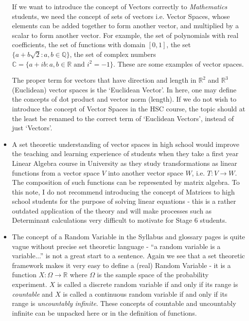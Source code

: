 \documentclass[11pt, a4paper, oneside]{article}
\begin{document}
\begin{itemize}
    If we want to introduce the concept of Vectors correctly to \emph{Mathematics} students, we need the concept of sets of vectors i.e. Vector Spaces, whose elements can be added together to form another vector, and multiplied by a scalar to form another vector. For example, the set of polynomials with real coefficients, the set of functions with domain $[0,1]$, the set $\{ a + b \sqrt{2} : a,b \in \mathbb{Q} \}$, the set of complex numbers $\mathbb{C} = \{ a + ib : a, b \in \mathbb{R} \mbox{ and } i^2 = -1 \}$. These are some examples of vector spaces.

    The proper term for vectors that have direction and length in $\mathbb{R}^2$ and $\mathbb{R}^3$ (Euclidean) vector spaces is the `Euclidean Vector'. In here, one may define the concepts of dot product and vector norm (length). If we do not wish to introduce the concept of Vector Spaces in the HSC course, the topic should at the least be renamed to the correct term of `Euclidean Vectors', instead of just `Vectors'.

  \item A set theoretic understanding of vector spaces in high school would improve the teaching and learning experience of students when they take a first year Linear Algebra course in University as they study transformations as linear functions from a vector space $V$ into another vector space $W$, i.e. $T: V \rightarrow W$. The composition of such functions can be represented by matrix algebra. To this note, I do not recommend introducing the concept of Matrices to high school students for the purpose of solving linear equations - this is a rather outdated application of the theory and will make processes such as Determinant calculations very difficult to motivate for Stage 6 students.

  \item The concept of a Random Variable in the Syllabus and glossary pages is quite vague without precise set theoretic language - ``a random variable is a variable...'' is not a great start to a sentence. Again we see that a set theoretic framework makes it very easy to define a (real) Random Variable - it is a function $X: \Omega \rightarrow \mathbb{R}$ where $\Omega$ is the sample space of the probability experiment. $X$ is called a discrete random variable if and only if its range is \emph{countable} and $X$ is called a continuous random variable if and only if its range is \emph{uncountably infinite}. These concepts of countable and uncountably infinite can be unpacked here or in the definition of functions.


\end{itemize}
\end{document}
